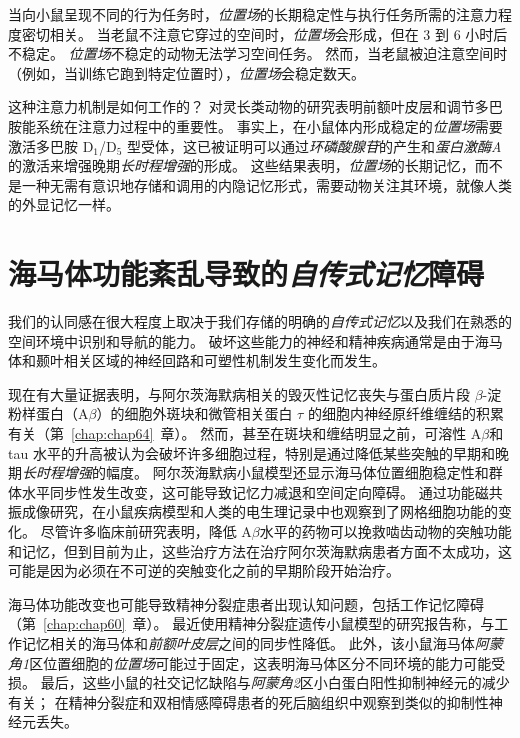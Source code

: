 当向小鼠呈现不同的行为任务时，\textit{位置场}的长期稳定性与执行任务所需的注意力程度密切相关。
当老鼠不注意它穿过的空间时，\textit{位置场}会形成，但在 3 到 6 小时后不稳定。
\textit{位置场}不稳定的动物无法学习空间任务。
然而，当老鼠被迫注意空间时（例如，当训练它跑到特定位置时），\textit{位置场}会稳定数天。


这种注意力机制是如何工作的？
对灵长类动物的研究表明前额叶皮层和调节多巴胺能系统在注意力过程中的重要性。
事实上，在小鼠体内形成稳定的\textit{位置场}需要激活多巴胺 D$_1$/D$_5$ 型受体，这已被证明可以通过\textit{环磷酸腺苷}的产生和\textit{蛋白激酶A}的激活来增强晚期\textit{长时程增强}的形成。
这些结果表明，\textit{位置场}的长期记忆，而不是一种无需有意识地存储和调用的内隐记忆形式，需要动物关注其环境，就像人类的外显记忆一样。



\section{海马体功能紊乱导致的\textit{自传式记忆}障碍}

我们的认同感在很大程度上取决于我们存储的明确的\textit{自传式记忆}以及我们在熟悉的空间环境中识别和导航的能力。
破坏这些能力的神经和精神疾病通常是由于海马体和颞叶相关区域的神经回路和可塑性机制发生变化而发生。


现在有大量证据表明，与阿尔茨海默病相关的毁灭性记忆丧失与蛋白质片段 $\beta$-淀粉样蛋白（A$\beta$）的细胞外斑块和微管相关蛋白 $ \tau $ 的细胞内神经原纤维缠结的积累有关（第~\ref{chap:chap64}~章）。
然而，甚至在斑块和缠结明显之前，可溶性 A$\beta$和 tau 水平的升高被认为会破坏许多细胞过程，特别是通过降低某些突触的早期和晚期\textit{长时程增强}的幅度。
阿尔茨海默病小鼠模型还显示海马体位置细胞稳定性和群体水平同步性发生改变，这可能导致记忆力减退和空间定向障碍。
通过功能磁共振成像研究，在小鼠疾病模型和人类的电生理记录中也观察到了网格细胞功能的变化。
尽管许多临床前研究表明，降低 A$\beta$水平的药物可以挽救啮齿动物的突触功能和记忆，但到目前为止，这些治疗方法在治疗阿尔茨海默病患者方面不太成功，这可能是因为必须在不可逆的突触变化之前的早期阶段开始治疗。


海马体功能改变也可能导致精神分裂症患者出现认知问题，包括工作记忆障碍（第~\ref{chap:chap60}~章）。
最近使用精神分裂症遗传小鼠模型的研究报告称，与工作记忆相关的海马体和\textit{前额叶皮层}之间的同步性降低。
此外，该小鼠海马体\textit{阿蒙角1}区位置细胞的\textit{位置场}可能过于固定，这表明海马体区分不同环境的能力可能受损。
最后，这些小鼠的社交记忆缺陷与\textit{阿蒙角2}区小白蛋白阳性抑制神经元的减少有关；
在精神分裂症和双相情感障碍患者的死后脑组织中观察到类似的抑制性神经元丢失。


